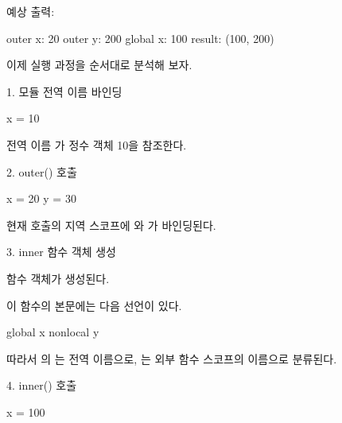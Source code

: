 예상 출력:

\begin{dhkzsh}
outer x: 20
outer y: 200
global x: 100
result: (100, 200)
\end{dhkzsh}

이제 실행 과정을 순서대로 분석해 보자.

\begin{dhknote}
\begin{dhksmry}[centered]
1. 모듈 전역 이름 바인딩
\end{dhksmry}
\end{dhknote}

\begin{dhkcode}
x = 10
\end{dhkcode}

전역 이름 가 정수 객체 10을 참조한다.

\begin{dhknote}
\begin{dhksmry}[centered]
2. outer() 호출
\end{dhksmry}
\end{dhknote}

\begin{dhkcode}
x = 20
y = 30
\end{dhkcode}

현재  호출의 지역 스코프에 와 가 바인딩된다.

\begin{dhknote}
\begin{dhksmry}[centered]
3. inner 함수 객체 생성
\end{dhksmry}
\end{dhknote}

 함수 객체가 생성된다.

이 함수의 본문에는 다음 선언이 있다.

\begin{dhkcode}
global x
nonlocal y
\end{dhkcode}

따라서 의 는 전역 이름으로, 는 외부 함수 스코프의 이름으로 분류된다.

\begin{dhknote}
\begin{dhksmry}[centered]
4. inner() 호출
\end{dhksmry}
\end{dhknote}

\begin{dhkcode}
x = 100
\end{dhkcode}


